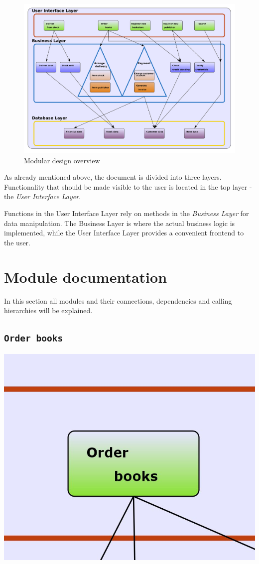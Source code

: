 \begin{figure}[H]
\centering
\includegraphics[scale=0.75,angle=270]{Modular_design.png}
\caption{Modular design overview}
\end{figure}

As already mentioned above, the document is divided into three layers. Functionality that should be made visible to the user is located in the top layer - the \emph{User Interface Layer}.

Functions in the User Interface Layer rely on methods in the \emph{Business Layer} for data manipulation. The Business Layer is where the actual business logic is implemented, while the User Interface Layer provides a convenient frontend to the user.
\chapter{Module documentation}
In this section all modules and their connections, dependencies and calling hierarchies will be explained.

\section{\texttt{Order books}}

\includegraphics[scale=0.8]{screenshots/Order_book.jpeg}

